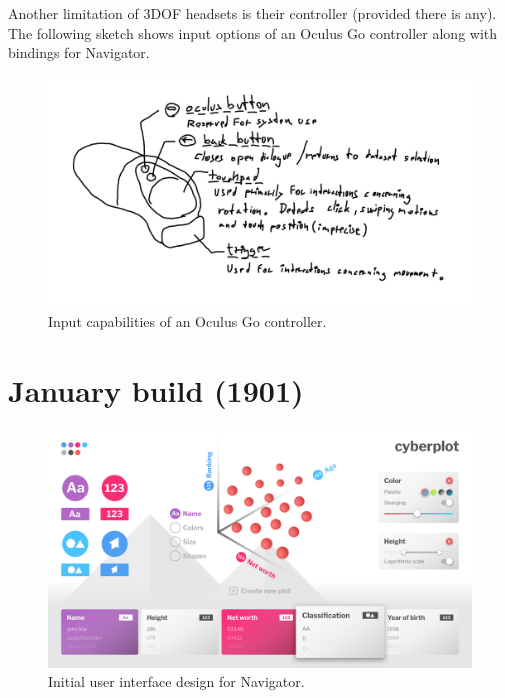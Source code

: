 \documentclass[thesis=M,english,hidelinks]{FITthesisXE}[2012/06/26]
\begin{document}
Another limitation of 3DOF headsets is their controller (provided there is any). The following sketch shows input options of an Oculus Go controller along with bindings for Navigator.

\begin{figure}[ht]
\centering
\includegraphics[scale=0.85]{sketch_3dofcontroller}
\caption{Input capabilities of an Oculus Go controller.}
\label{fig:sketch_3dofcontroller}
\end{figure}

\section{January build (1901)}

\begin{figure}[ht]
\centering
\includegraphics[scale=0.2]{ui_design}
\caption{Initial user interface design for Navigator.}
\label{fig:ui_design}
\end{figure}
\end{document}
